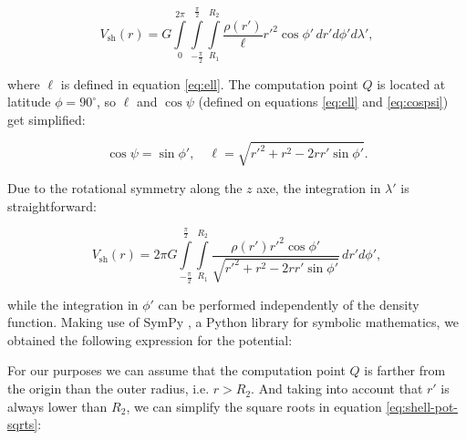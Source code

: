 \documentclass[extra]{gji}
\begin{document}
\begin{equation}
    V_\text{sh}(r) = G
    \int\limits_0^{2\pi}
    \int\limits_{-\frac{\pi}{2}}^\frac{\pi}{2}
    \int\limits_{R_1}^{R_2}
    \frac{\rho(r')}{\ell} {r'}^2 \cos\phi' \,
    dr' d\phi' d\lambda',
\end{equation}

\noindent where $\ell$ is defined in equation \ref{eq:ell}. The computation
point $Q$ is located at latitude $\phi=90^\circ$, so $\ell$ and $\cos\psi$
(defined on equations \ref{eq:ell} and \ref{eq:cospsi}) get simplified:

\begin{equation}
    \cos\psi = \sin\phi', \quad
    \ell = \sqrt{r'^2 + r^2 - 2 r r' \sin\phi'}.
\end{equation}

Due to the rotational symmetry along the $z$ axe, the integration in
$\lambda'$ is straightforward:

\begin{equation}
    V_\text{sh}(r) = 2\pi G
    \int\limits_{-\frac{\pi}{2}}^\frac{\pi}{2}
    \int\limits_{R_1}^{R_2}
    \frac{\rho(r') {r'}^2 \cos\phi'}{\sqrt{r'^2 + r^2 - 2 r r' \sin\phi'}}
    \, dr' d\phi',
\end{equation}

\noindent while the integration in $\phi'$ can be performed
independently of the density function.
Making use of SymPy \citep{sympy2017}, a Python library for symbolic
mathematics, we obtained the following expression for the potential:


For our purposes we can assume that the computation point $Q$ is
farther from the origin than the outer radius, i.e. $r>R_2$.
And taking into account that $r'$ is always lower than $R_2$, we can
simplify the square roots in equation \ref{eq:shell-pot-sqrts}:
\end{document}
